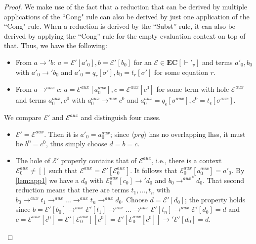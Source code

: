 \cdpaux*
\begin{proof}
We make use of the fact that a reduction that can be derived by multiple applications of the ``Cong" rule can also be derived by just one application of the ``Cong" rule. When a reduction is derived by the ``Subst'' rule, it can also be derived by applying the ``Cong'' rule for the empty evaluation context on top of that. Thus, we have the following:
\begin{itemize}
\item From $a \longrightarrow' b$: $a = \mathcal{E}'[a'_0], b = \mathcal{E}'[b_0]$ for an $\mathcal{E} \in \mathbf{EC}[\vdash'_v]$ and terms $a'_0, b_0$ with $a'_0 \longrightarrow' b_0$ and $a'_0 = q_r[\sigma'], b_0 = t_r[\sigma']$ for some equation $r$.

\item From $a \longrightarrow^{aux} c$: $a = \mathcal{E}^{aux}[a^{aux}_0], c = \mathcal{E}^{aux}[c^0]$ for some term with hole $\mathcal{E}^{aux}$ and terms $a^{aux}_0, c^0$ with $a^{aux}_0 \longrightarrow^{aux} c^0$ and $a^{aux}_0 = q_\epsilon[\sigma^{aux}], c^0 = t_\epsilon[\sigma^{aux}]$.
\end{itemize}

We compare $\mathcal{E}'$ and $\mathcal{E}^{aux}$ and distinguish four cases.
\begin{itemize}
\item $\mathcal{E}' = \mathcal{E}^{aux}$. Then it is $a'_0 = a^{aux}_0$; since $\langle prg \rangle$ has no overlapping lhss, it must be $b^0 = c^0$, thus simply choose $d = b = c$.

\item The hole of $\mathcal{E}'$ properly contains that of $\mathcal{E}^{aux}$, i.e., there is a context $\mathcal{E}^{aux}_0 \neq []$ such that $\mathcal{E}^{aux} = \mathcal{E}'[\mathcal{E}^{aux}_0]$. It follows that $\mathcal{E}^{aux}_0[a^{aux}_0] = a'_0$. By \autoref{lem:app1} we have a $d_0$ with $\mathcal{E}^{aux}_0[c_0] \longrightarrow' d_0$ and $b_0 {\longrightarrow^{aux}}^* d_0$. That second reduction means that there are terms $t_1, ..., t_n$ with $b_0 \longrightarrow^{aux} t_1 \longrightarrow^{aux} ... \longrightarrow^{aux} t_n \longrightarrow^{aux} d_0$. Choose $d = \mathcal{E}'[d_0]$; the property holds since $b = \mathcal{E}'[b_0] \longrightarrow^{aux} \mathcal{E}'[t_1] \longrightarrow^{aux} ... \longrightarrow^{aux} \mathcal{E}'[t_n] \longrightarrow^{aux} \mathcal{E}'[d_0] = d$ and $c = \mathcal{E}^{aux}[c^0] = \mathcal{E}'[\mathcal{E}^{aux}_0][c^0] = \mathcal{E}'[\mathcal{E}^{aux}_0[c^0]] \longrightarrow' \mathcal{E}'[d_0] = d$.


\end{itemize}
\end{proof}
